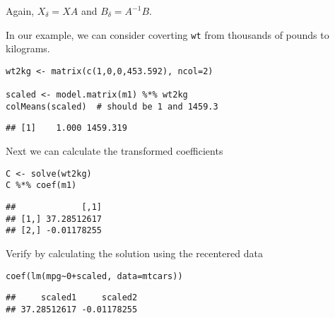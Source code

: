 \documentclass[]{article}
\begin{document}
Again, \(X_\delta=XA\) and \(B_\delta=A^{-1}B\).

In our example, we can consider coverting \texttt{wt} from thousands of
pounds to kilograms.

\begin{verbatim}
wt2kg <- matrix(c(1,0,0,453.592), ncol=2)

scaled <- model.matrix(m1) %*% wt2kg
colMeans(scaled)  # should be 1 and 1459.3
\end{verbatim}

\begin{verbatim}
## [1]    1.000 1459.319
\end{verbatim}

Next we can calculate the transformed coefficients

\begin{verbatim}
C <- solve(wt2kg)
C %*% coef(m1)
\end{verbatim}

\begin{verbatim}
##             [,1]
## [1,] 37.28512617
## [2,] -0.01178255
\end{verbatim}

Verify by calculating the solution using the recentered data

\begin{verbatim}
coef(lm(mpg~0+scaled, data=mtcars))
\end{verbatim}

\begin{verbatim}
##     scaled1     scaled2 
## 37.28512617 -0.01178255
\end{verbatim}
\end{document}
